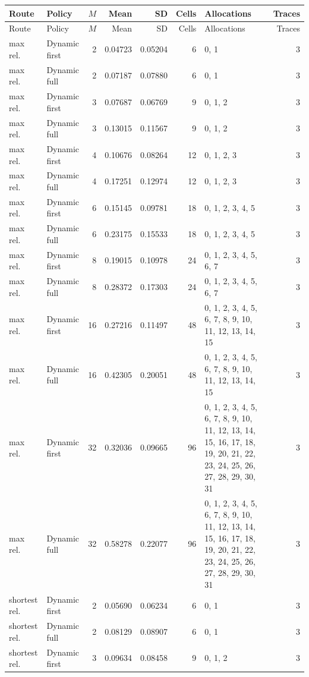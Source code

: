 \documentclass[10pt,a4paper]{article}
\begin{document}
\tiny\setlength{\tabcolsep}{2pt}\begin{longtable}{@{}p{23mm}p{29mm}rrrrp{36mm}r@{}}
\toprule Route & Policy & $M$ & Mean & SD & Cells & Allocations & Traces \\ \midrule\endfirsthead
\toprule Route & Policy & $M$ & Mean & SD & Cells & Allocations & Traces \\ \midrule\endhead
\bottomrule\endfoot
max rel. & Dynamic first & 2 & 0.04723 & 0.05204 & 6 & 0, 1 & 3 \\
max rel. & Dynamic full & 2 & 0.07187 & 0.07880 & 6 & 0, 1 & 3 \\
max rel. & Dynamic first & 3 & 0.07687 & 0.06769 & 9 & 0, 1, 2 & 3 \\
max rel. & Dynamic full & 3 & 0.13015 & 0.11567 & 9 & 0, 1, 2 & 3 \\
max rel. & Dynamic first & 4 & 0.10676 & 0.08264 & 12 & 0, 1, 2, 3 & 3 \\
max rel. & Dynamic full & 4 & 0.17251 & 0.12974 & 12 & 0, 1, 2, 3 & 3 \\
max rel. & Dynamic first & 6 & 0.15145 & 0.09781 & 18 & 0, 1, 2, 3, 4, 5 & 3 \\
max rel. & Dynamic full & 6 & 0.23175 & 0.15533 & 18 & 0, 1, 2, 3, 4, 5 & 3 \\
max rel. & Dynamic first & 8 & 0.19015 & 0.10978 & 24 & 0, 1, 2, 3, 4, 5, 6, 7 & 3 \\
max rel. & Dynamic full & 8 & 0.28372 & 0.17303 & 24 & 0, 1, 2, 3, 4, 5, 6, 7 & 3 \\
max rel. & Dynamic first & 16 & 0.27216 & 0.11497 & 48 & 0, 1, 2, 3, 4, 5, 6, 7, 8, 9, 10, 11, 12, 13, 14, 15 & 3 \\
max rel. & Dynamic full & 16 & 0.42305 & 0.20051 & 48 & 0, 1, 2, 3, 4, 5, 6, 7, 8, 9, 10, 11, 12, 13, 14, 15 & 3 \\
max rel. & Dynamic first & 32 & 0.32036 & 0.09665 & 96 & 0, 1, 2, 3, 4, 5, 6, 7, 8, 9, 10, 11, 12, 13, 14, 15, 16, 17, 18, 19, 20, 21, 22, 23, 24, 25, 26, 27, 28, 29, 30, 31 & 3 \\
max rel. & Dynamic full & 32 & 0.58278 & 0.22077 & 96 & 0, 1, 2, 3, 4, 5, 6, 7, 8, 9, 10, 11, 12, 13, 14, 15, 16, 17, 18, 19, 20, 21, 22, 23, 24, 25, 26, 27, 28, 29, 30, 31 & 3 \\
shortest rel. & Dynamic first & 2 & 0.05690 & 0.06234 & 6 & 0, 1 & 3 \\
shortest rel. & Dynamic full & 2 & 0.08129 & 0.08907 & 6 & 0, 1 & 3 \\
shortest rel. & Dynamic first & 3 & 0.09634 & 0.08458 & 9 & 0, 1, 2 & 3 \\

\end{longtable}
\end{document}
